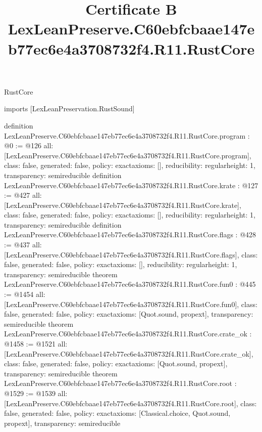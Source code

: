 \begin{lexlean}{RustCore}
\title{Certificate B LexLeanPreserve.C60ebfcbaae147eb77ec6e4a3708732f4.R11.RustCore}
\begin{coremodule}
imports [LexLeanPreservation.RustSound]

definition LexLeanPreserve.C60ebfcbaae147eb77ec6e4a3708732f4.R11.RustCore.program : @0 := @126 {
  all: [LexLeanPreserve.C60ebfcbaae147eb77ec6e4a3708732f4.R11.RustCore.program],
  class: false,
  generated: false,
  policy: exact{axioms: []},
  reducibility: regular{height: 1},
  transparency: semireducible
}
definition LexLeanPreserve.C60ebfcbaae147eb77ec6e4a3708732f4.R11.RustCore.krate : @127 := @427 {
  all: [LexLeanPreserve.C60ebfcbaae147eb77ec6e4a3708732f4.R11.RustCore.krate],
  class: false,
  generated: false,
  policy: exact{axioms: []},
  reducibility: regular{height: 1},
  transparency: semireducible
}
definition LexLeanPreserve.C60ebfcbaae147eb77ec6e4a3708732f4.R11.RustCore.flags : @428 := @437 {
  all: [LexLeanPreserve.C60ebfcbaae147eb77ec6e4a3708732f4.R11.RustCore.flags],
  class: false,
  generated: false,
  policy: exact{axioms: []},
  reducibility: regular{height: 1},
  transparency: semireducible
}
theorem LexLeanPreserve.C60ebfcbaae147eb77ec6e4a3708732f4.R11.RustCore.fun0 : @445 := @1454 {
  all: [LexLeanPreserve.C60ebfcbaae147eb77ec6e4a3708732f4.R11.RustCore.fun0],
  class: false,
  generated: false,
  policy: exact{axioms: [Quot.sound, propext]},
  transparency: semireducible
}
theorem LexLeanPreserve.C60ebfcbaae147eb77ec6e4a3708732f4.R11.RustCore.crate_ok : @1458 := @1521 {
  all: [LexLeanPreserve.C60ebfcbaae147eb77ec6e4a3708732f4.R11.RustCore.crate_ok],
  class: false,
  generated: false,
  policy: exact{axioms: [Quot.sound, propext]},
  transparency: semireducible
}
theorem LexLeanPreserve.C60ebfcbaae147eb77ec6e4a3708732f4.R11.RustCore.root : @1529 := @1539 {
  all: [LexLeanPreserve.C60ebfcbaae147eb77ec6e4a3708732f4.R11.RustCore.root],
  class: false,
  generated: false,
  policy: exact{axioms: [Classical.choice, Quot.sound, propext]},
  transparency: semireducible
}


\end{coremodule}
\end{lexlean}
